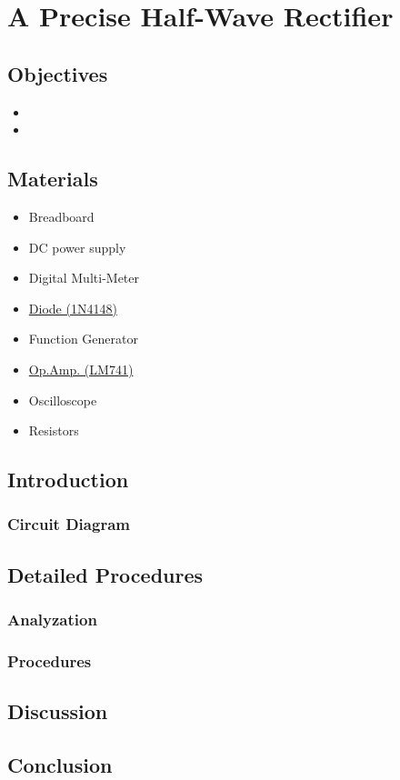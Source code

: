 \chapter{A Precise Half-Wave Rectifier}


\section{Objectives}
\begin{itemize}
    \item 
    \item 
\end{itemize}

\section{Materials}
\begin{itemize}
    \item Breadboard
    \item DC power supply
    \item Digital Multi-Meter
    \item \hyperref[1N4148]{Diode (1N4148)}
    \item Function Generator
    \item \hyperref[LM741_1]{Op.Amp. (LM741)}
    \item Oscilloscope
    \item Resistors
\end{itemize}

\section{Introduction}
    \subsection{Circuit Diagram}


\section{Detailed Procedures}
    \subsection{Analyzation}


    \subsection{Procedures}

    
\section{Discussion}


\section{Conclusion}